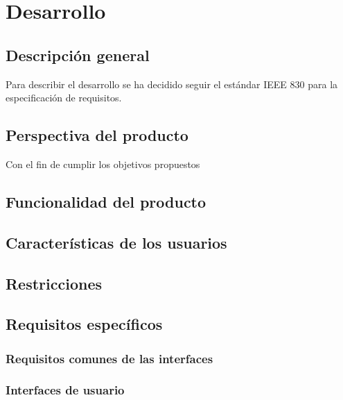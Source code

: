 \chapter{Desarrollo}

\section{Descripción general}

Para describir el desarrollo se ha decidido seguir el estándar IEEE 830 para la especificación de requisitos.

\section{Perspectiva del producto}

Con el fin de cumplir los objetivos propuestos

\section{Funcionalidad del producto}

\section{Características de los usuarios}

\section{Restricciones}

\section{Requisitos específicos}

\subsection{Requisitos comunes de las interfaces}

\subsection{Interfaces de usuario}


